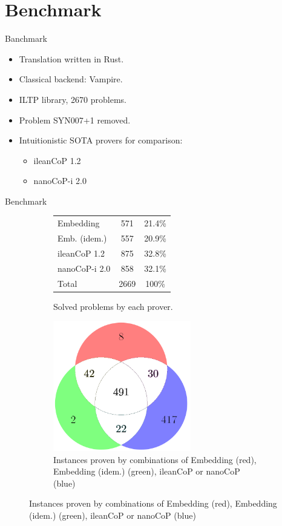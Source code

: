 \documentclass{cubeamer}
\begin{document}
	\section{Benchmark}
	
	\begin{frame}{Banchmark}
		\begin{itemize}
			\item Translation written in Rust.
			\item Classical backend: Vampire.
			\item ILTP library, 2670 problems.
			\item Problem \textsc{SYN007+1} removed.
			\item Intuitionistic SOTA provers for comparison:
			\begin{itemize}
				\item ileanCoP 1.2
				\item nanoCoP-i 2.0
			\end{itemize}
		\end{itemize}
	\end{frame}

	\begin{frame}{Benchmark}
		\begin{figure}
			\begin{subfigure}{0.39\textwidth}			
				\centering
					\begin{tabular}{l|c|c}
						Embedding&571&21.4\%\\
						Emb. (idem.)&557&20.9\%\\
						ileanCoP 1.2&875&32.8\%\\
						nanoCoP-i 2.0&858&32.1\%\\\hline
						Total&2669&100\%
					\end{tabular}
					\vspace{1.2cm}
					\caption{Solved problems by each prover.}
			\end{subfigure}	
			\begin{subfigure}{0.6\textwidth}
				\centering
				\includegraphics[width=0.66\textwidth]{circleplot.png}
				\caption{Instances proven by combinations of Embedding (red), Embedding (idem.) (green), ileanCoP or nanoCoP (blue)}
			\end{subfigure}
		\end{figure}
	\end{frame}
	
\end{document}
